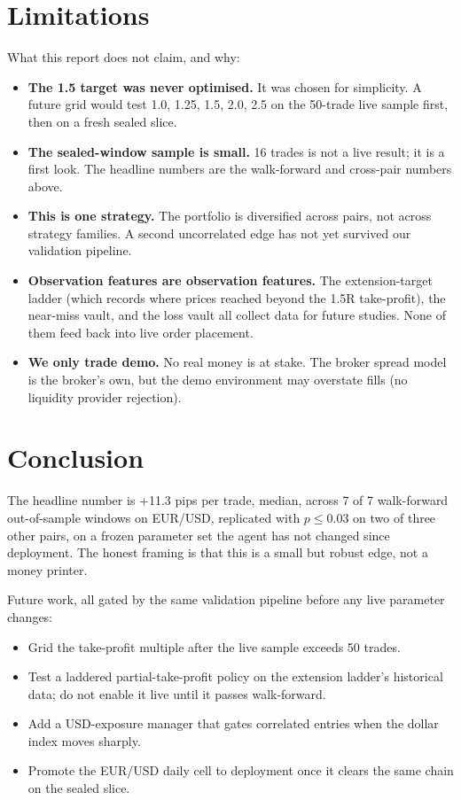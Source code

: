 \documentclass[11pt,a4paper]{article}
\begin{document}
\section{Limitations}\label{sec:limits}

What this report does not claim, and why:

\begin{itemize}
  \item \textbf{The 1.5 target was never optimised.} It was chosen for
        simplicity. A future grid would test 1.0, 1.25, 1.5, 2.0, 2.5
        on the 50-trade live sample first, then on a fresh sealed slice.
  \item \textbf{The sealed-window sample is small.} 16 trades is not a
        live result; it is a first look. The headline numbers are the
        walk-forward and cross-pair numbers above.
  \item \textbf{This is one strategy.} The portfolio is diversified
        across pairs, not across strategy families. A second
        uncorrelated edge has not yet survived our validation pipeline.
  \item \textbf{Observation features are observation features.} The
        extension-target ladder (which records where prices reached
        beyond the 1.5R take-profit), the near-miss vault, and the loss
        vault all collect data for future studies. None of them feed
        back into live order placement.
  \item \textbf{We only trade demo.} No real money is at stake. The
        broker spread model is the broker's own, but the demo
        environment may overstate fills (no liquidity provider
        rejection).
\end{itemize}

\section{Conclusion}\label{sec:conclusion}

The headline number is +11.3 pips per trade, median, across 7 of 7
walk-forward out-of-sample windows on EUR/USD, replicated with
$p \le 0.03$ on two of three other pairs, on a frozen parameter set the
agent has not changed since deployment. The honest framing is that this
is a small but robust edge, not a money printer.

Future work, all gated by the same validation pipeline before any live
parameter changes:

\begin{itemize}
  \item Grid the take-profit multiple after the live sample exceeds 50
        trades.
  \item Test a laddered partial-take-profit policy on the extension
        ladder's historical data; do not enable it live until it passes
        walk-forward.
  \item Add a USD-exposure manager that gates correlated entries when
        the dollar index moves sharply.
  \item Promote the EUR/USD daily cell to deployment once it clears the
        same chain on the sealed slice.
\end{itemize}
\end{document}
